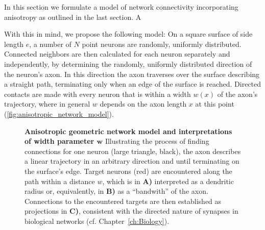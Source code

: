 
In this section we formulate a model of network connectivity
incorporating anisotropy as outlined in the last section. A 

With this in mind, we propose the following model: On a square surface
of side length $e$, a number of $N$ point neurons are randomly,
uniformly distributed.  Connected neighbors are then calculated for
each neuron separately and independently, by determining the randomly,
uniformly distributed direction of the neuron's axon. In this
direction the axon traverses over the surface describing a straight
path, terminating only when an edge of the surface is
reached. Directed contacts are made with every neuron that is within a
width $w(x)$ of the axon's trajectory, where in general $w$ depends on
the axon length $x$ at this point
(\autoref{fig:anisotropic_network_model}).

\begin{figure}[!htbp]
  \centering 
    \caption{%
      \textbf{Anisotropic geometric network model and interpretations
        of width parameter $\boldsymbol w$} Illustrating the process of
      finding connections for one neuron (large triangle, black), the
      axon describes a linear trajectory in an arbitrary direction and
      until terminating on the surface's edge. Target neurons (red)
      are encountered along the path within a distance $w$, which is in
      \textbf{A)} interpreted as a dendritic radius or, equivalently,
      in \textbf{B)} as a \enquote{bandwith} of the axon. Connections
      to the encountered targets are then established as projections
      in \textbf{C)}, consistent with the directed nature of synapses
      in biological networks (cf. Chapter~\ref{ch:Biology}).}
  \label{fig:anisotropic_network_model}
\end{figure}

